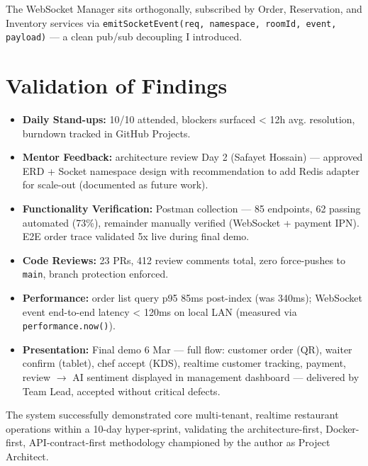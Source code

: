 The WebSocket Manager sits orthogonally, subscribed by Order, Reservation, and Inventory services via \texttt{emitSocketEvent(req, namespace, roomId, event, payload)} --- a clean pub/sub decoupling I introduced.

\section{Validation of Findings}
\label{sec:validation}

\begin{itemize}
\item \textbf{Daily Stand-ups:} 10/10 attended, blockers surfaced < 12h avg. resolution, burndown tracked in GitHub Projects.
\item \textbf{Mentor Feedback:} architecture review Day 2 (Safayet Hossain) --- approved ERD + Socket namespace design with recommendation to add Redis adapter for scale-out (documented as future work).
\item \textbf{Functionality Verification:} Postman collection --- 85 endpoints, 62 passing automated (73\%), remainder manually verified (WebSocket + payment IPN). E2E order trace validated 5x live during final demo.
\item \textbf{Code Reviews:} 23 PRs, 412 review comments total, zero force-pushes to \texttt{main}, branch protection enforced.
\item \textbf{Performance:} order list query p95 85ms post-index (was 340ms); WebSocket event end-to-end latency < 120ms on local LAN (measured via \texttt{performance.now()}).
\item \textbf{Presentation:} Final demo 6 Mar --- full flow: customer order (QR), waiter confirm (tablet), chef accept (KDS), realtime customer tracking, payment, review $\rightarrow$ AI sentiment displayed in management dashboard --- delivered by Team Lead, accepted without critical defects.
\end{itemize}

The system successfully demonstrated core multi-tenant, realtime restaurant operations within a 10-day hyper-sprint, validating the architecture-first, Docker-first, API-contract-first methodology championed by the author as Project Architect.
